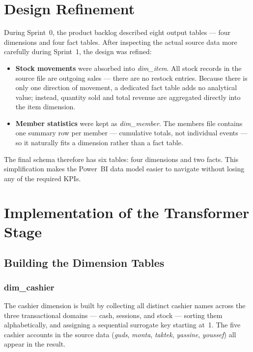 \section{Design Refinement}

During Sprint~0, the product backlog described eight output tables — four dimensions
and four fact tables. After inspecting the actual source data more carefully during
Sprint~1, the design was refined:

\begin{itemize}
  \item \textbf{Stock movements} were absorbed into \textit{dim\_item}. All stock
        records in the source file are outgoing sales — there are no restock entries.
        Because there is only one direction of movement, a dedicated fact table adds
        no analytical value; instead, quantity sold and total revenue are aggregated
        directly into the item dimension.

  \item \textbf{Member statistics} were kept as \textit{dim\_member}. The members
        file contains one summary row per member — cumulative totals, not individual
        events — so it naturally fits a dimension rather than a fact table.
\end{itemize}

The final schema therefore has six tables: four dimensions and two facts. This
simplification makes the Power~BI data model easier to navigate without losing any
of the required KPIs.

\section{Implementation of the Transformer Stage}

\subsection{Building the Dimension Tables}

\subsubsection{dim\_cashier}

The cashier dimension is built by collecting all distinct cashier names across the
three transactional domains — cash, sessions, and stock — sorting them alphabetically,
and assigning a sequential surrogate key starting at~1. The five cashier accounts
in the source data (\textit{guds}, \textit{monta}, \textit{taktek},
\textit{yassine}, \textit{youssef}) all appear in the result.

